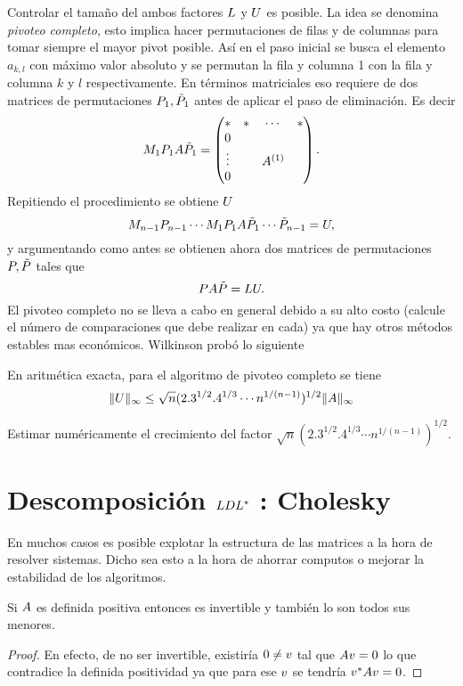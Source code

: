 \begin{tcolorbox}
Controlar el tamaño del ambos factores $\Lb$ y $\Ub$ es posible.
La idea se denomina \emph{pivoteo completo}, esto implica hacer permutaciones de filas y de columnas para tomar siempre el mayor pivot posible. Así en el paso inicial se busca el elemento $a_{k,l}$ con máximo valor absoluto y se permutan la fila y columna 1 con la fila y columna $k$ y $l$ respectivamente.  En términos matriciales eso requiere de dos matrices de permutaciones $\Pb_1,\tilde \Pb_1$ antes de aplicar el paso de eliminación. Es decir
$$
\Mb_1\Pb_1\Ab\tilde\Pb_1=
\begin{pmatrix}
 *&*&\cdots &*\\
 0&&&\\
  \vdots&&\Ab^{(1)}&\\
 0&&&\\

\end{pmatrix}.
$$
Repitiendo el procedimiento se obtiene $\Ub$
$$
\Mb_{n-1}\Pb_{n-1}\cdots \Mb_1\Pb_1\Ab\tilde\Pb_1\cdots \tilde\Pb_{n-1}=\Ub,
$$
y argumentando como antes se obtienen ahora dos matrices de permutaciones $\Pb,\tilde\Pb$ tales que
$$
\Pb\Ab\tilde\Pb=\Lb\Ub.
$$
El pivoteo completo no se lleva a cabo en general debido a su alto costo (calcule el número de comparaciones que debe realizar en cada) ya que hay otros métodos estables mas económicos. Wilkinson probó lo siguiente
\tcc
\begin{teo}
 En aritmética exacta, para el algoritmo de pivoteo completo se tiene
 $$
 \|\Ub\|_{\infty}\le \sqrt{n}(2.3^{1/2}.4^{1/3}\cdots n^{1/(n-1)})^{1/2}\|\Ab\|_\infty
 $$
\end{teo}
\etcc
\begin{ej}
 Estimar numéricamente el crecimiento del factor
 $\sqrt{n}(2.3^{1/2}.4^{1/3}\cdots n^{1/(n-1)})^{1/2}$.
\end{ej}

\section{Descomposición $\Lb \Db\Lb^*$ : Cholesky}


En muchos casos es posible explotar la estructura de las matrices a la hora de resolver sistemas. Dicho sea esto a la hora de ahorrar computos o mejorar la estabilidad de los algoritmos.


\begin{prop}
\label{prop:defposesinvert}
Si $\Ab$ es definida positiva entonces es invertible y también lo son todos sus menores.
\end{prop}
\begin{proof}
 En efecto, de no ser invertible, existiría $\cero\neq\vb$ tal que
 $\Ab\vb=\cero$ lo que contradice la definida positividad ya que para ese $\vb$ se tendría $\vb^*\Ab\vb=0$.


\end{proof}
\end{tcolorbox}
